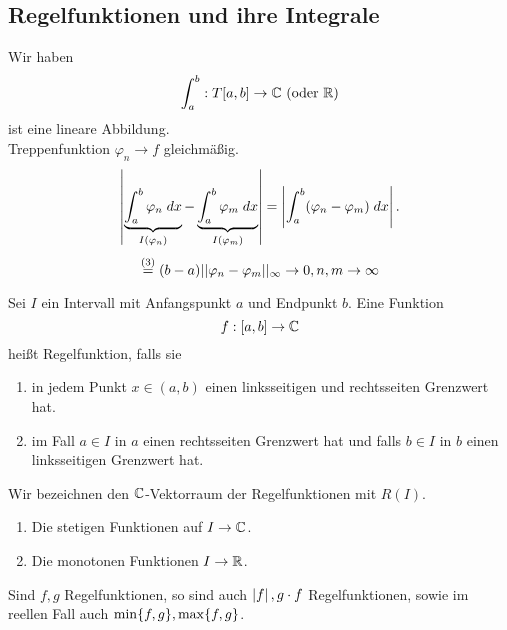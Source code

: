 \documentclass[../ana2.tex]{subfiles}
\begin{document}
\subsection{Regelfunktionen und ihre Integrale}
Wir haben 
\[ \abb{\int_a^b}{T[a,b]}{\C} \text{ (oder } \R \text{)} \]
ist eine lineare Abbildung.\\
Treppenfunktion \( \varphi_n \rightarrow f \) gleichmäßig.
\[ \abs{ \underbrace{\integral{\varphi_n} {a}{b}}_{I(\varphi_n)} 
- \underbrace{\integral{\varphi_m} {a}{b}}_{I(\varphi_m)} } 
= \abs{ \integral{(\varphi_n - \varphi_m)}{a}{b} }. \]
\[ \oversett{(3)}{=} (b-a) ||\varphi_n-\varphi_m||_\infty 
\rightarrow 0, n,m \rightarrow \infty \]
\begin{defi}[Regelfunktion]
    Sei \( I \) ein Intervall mit Anfangspunkt \(a\) 
    und Endpunkt \(b\). Eine Funktion 
    \[ \abb{f}{[a,b]}{\C} \] 
    heißt Regelfunktion, falls sie 
    \begin{enumerate}
        \item in jedem Punkt \(x \in (a,b)\) 
        einen linksseitigen und rechtsseiten 
        Grenzwert hat.
        
        \item im Fall \( a \in I \) in \(a\) einen 
        rechtsseiten Grenzwert hat und falls 
        \( b \in I \) in \(b\) 
        einen linksseitigen Grenzwert hat.
    \end{enumerate}
    Wir bezeichnen den \( \C \)-Vektorraum der 
    Regelfunktionen mit \( R(I) \).
\end{defi}
\begin{bspe}
    \begin{enumerate}
        \item Die stetigen Funktionen auf \( I \rightarrow \C \).
        \item Die monotonen Funktionen \( I \rightarrow \R \).
    \end{enumerate}
\end{bspe}
Sind \( f,g \) Regelfunktionen, so sind auch 
\( \abs{f}, g\cdot f \) Regelfunktionen, sowie im 
reellen Fall auch \( \min\set{f,g}, \max\set{f,g} \).
\end{document}
